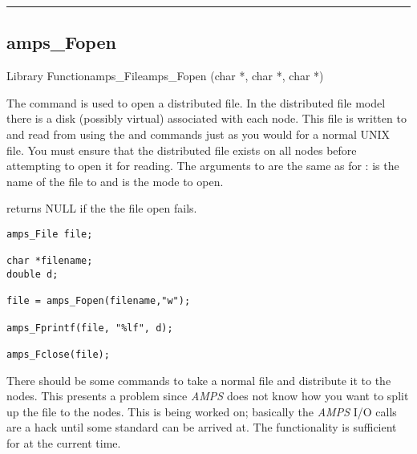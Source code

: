 
\noindent\rule{\textwidth}{1mm}

\subsection{amps\_Fopen}
\label{amps_Fopen}


\begin{deftypefn}{Library Function}{amps_File}{amps\_Fopen}
(char *, char *, char *)

\DESCRIPTION

The  command is used to open a distributed file.  In
the distributed file model there is a disk (possibly virtual) associated
with each node.  This file is written to and read from using the
 and  commands just as you would
for a normal UNIX file.  You must ensure that the distributed
file exists on all nodes before attempting to open it for reading.  The
arguments to  are the same as for :
 is the name of the file to and  is the mode to
open.

 returns NULL if the the file open fails.

\EXAMPLE
\begin{display}\begin{verbatim}
amps_File file;

char *filename;
double d;

file = amps_Fopen(filename,"w");

amps_Fprintf(file, "%lf", d);

amps_Fclose(file);
\end{verbatim}\end{display}

\NOTES

There should be some commands to take a normal file and distribute it
to the nodes.  This presents a problem since {\em AMPS} does not
know how you want to split up the file to the nodes.  This is being
worked on; basically the {\em AMPS} I/O calls are a hack until some standard
can be arrived at.  The functionality is sufficient for \parflow{} at
the current time.


\end{deftypefn}
